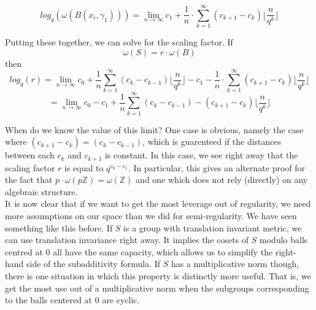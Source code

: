 \[log_q(\omega(B(x_i,\gamma_1))) = \lim_{n\to\infty} c_1 + \frac{1}{n}\cdot \sum_{k=1}^{\infty} (c_{k+1} - c_{k}) \lfloor \frac{n}{q^{k}}\rfloor\]

Putting these together, we can solve for the scaling factor.
If \[\omega(S) = r\cdot \omega(B)\] then
\[ log_q(r) = \lim_{n\to\infty} c_0 + \frac{1}{n} \sum_{k=1}^\infty (c_k - c_{k-1}) \lfloor \frac{n}{q^k} \rfloor -  c_1 - \frac{1}{n}\cdot \sum_{k=1}^{\infty} (c_{k+1} - c_{k}) \lfloor \frac{n}{q^{k}}\rfloor\]
\[ = \lim_{n\to\infty} c_0 -c_1 + \frac{1}{n} \sum_{k=1}^\infty (c_k - c_{k-1}) - (c_{k+1} - c_{k}) \lfloor \frac{n}{q^k} \rfloor \]

When do we know the value of this limit? One case is obvious, namely the case where $(c_{k+1} - c_{k}) = (c_{k} - c_{k-1})$, which is guarenteed if the distances between each $c_k$ and $c_{k+1}$ is constant. In this case, we see right away that the scaling factor $r$ is equal to $q^{c_0-c_1}$. In particular, this gives an alternate proof for the fact that $p \cdot \omega(p\mathbb{Z}) = \omega(\mathbb{Z})$ and one which does not rely (directly) on any algebraic structure. \\

It is now clear that if we want to get the most leverage out of regularity, we need more assumptions on our space than we did for semi-regularity. We have seen something like this before. If $S$ is a group with translation invariant metric, we can use translation invariance right away. It implies the cosets of $S$ modulo balls centred at $0$ all have the same capacity, which allows us to simplify the right-hand side of the subadditivity formula. If $S$ has a multiplicative norm though, there is one situation in which this property is distinctly more useful. That is, we get the most use out of a multiplicative norm when the subgroups corresponding to the balls centered at $0$ are cyclic.\\%


